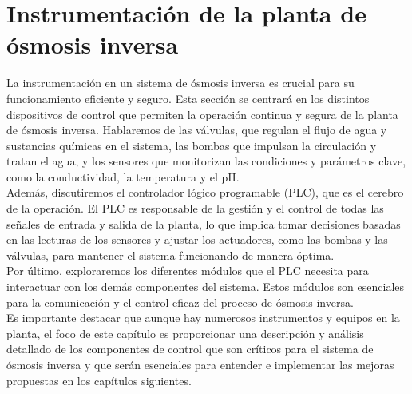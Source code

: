 \section{Instrumentación de la planta de ósmosis inversa}


La instrumentación en un sistema de ósmosis inversa es crucial para su funcionamiento eficiente y seguro. Esta sección se centrará en los distintos dispositivos de control que permiten la operación continua y segura de la planta de ósmosis inversa. Hablaremos de las válvulas, que regulan el flujo de agua y sustancias químicas en el sistema, las bombas que impulsan la circulación y tratan el agua, y los sensores que monitorizan las condiciones y parámetros clave, como la conductividad, la temperatura y el pH.\\

Además, discutiremos el controlador lógico programable (PLC), que es el cerebro de la operación. El PLC es responsable de la gestión y el control de todas las señales de entrada y salida de la planta, lo que implica tomar decisiones basadas en las lecturas de los sensores y ajustar los actuadores, como las bombas y las válvulas, para mantener el sistema funcionando de manera óptima.\\

Por último, exploraremos los diferentes módulos que el PLC necesita para interactuar con los demás componentes del sistema. Estos módulos son esenciales para la comunicación y el control eficaz del proceso de ósmosis inversa.\\

Es importante destacar que aunque hay numerosos instrumentos y equipos en la planta, el foco de este capítulo es proporcionar una descripción y análisis detallado de los componentes de control que son críticos para el sistema de ósmosis inversa y que serán esenciales para entender e implementar las mejoras propuestas en los capítulos siguientes.\\




% 
% 
% 
% 
% 
% 
% 
% 
% 
% 